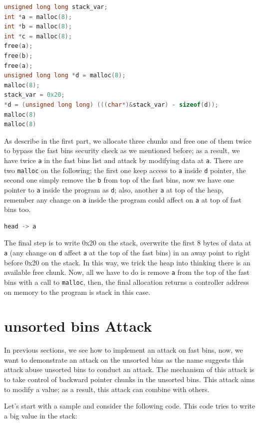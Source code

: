 \documentclass{masterthesis}
\newcommand*\fb{fast bins}
\newcommand*\ub{unsorted bins}
\newcommand*\mallocc{\lstinline{malloc}\xspace}
\begin{document}
\begin{lstlisting}[language=c,frame=tlrb]
unsigned long long stack_var;
int *a = malloc(8);
int *b = malloc(8);
int *c = malloc(8);
free(a);
free(b);
free(a);
unsigned long long *d = malloc(8);
malloc(8);
stack_var = 0x20;
*d = (unsigned long long) (((char*)&stack_var) - sizeof(d));
malloc(8)
malloc(8)
\end{lstlisting}

As describe in the first part, we allocate three chunks and free one of them twice to bypass the \fb{} security check as we mentioned before; as a result, we have twice \lstinline{a} in the \fb{} list and attack by modifying data at \lstinline{a}. There are two \mallocc{} on the following; the first one keep access to \lstinline{a} inside \lstinline{d} pointer, the second one simply remove the \lstinline{b} from top of the \fb{}, now we have one pointer to \lstinline{a} inside the program as \lstinline{d}; also, another \lstinline{a} at top of the heap, remember any change on \lstinline{a} inside the program could affect on \lstinline{a} at top of \fb{} too.

\begin{lstlisting}[language=c,frame=tlrb]
head -> a
\end{lstlisting}

The final step is to write 0x20 on the stack, overwrite the first 8 bytes of data at \lstinline{a} (any change on \lstinline{d} affect \lstinline{a} at the top of the \fb{}) in an away point to right before 0x20 on the stack. In this way, we trick the heap into thinking there is an available free chunk.
 Now, all we have to do is remove \lstinline{a} from the top of the \fb{} with a call to \mallocc{}, then, the final allocation returns a controller address on memory to the program is stack in this case.

\section{\ub{} Attack}

In previous sections, we see how to implement an attack on \fb{}, now, we want to demonstrate an attack on the \ub{} as the name suggests this attack abuse \ub{} to conduct an attack. The mechanism of this attack is to take control of backward pointer chunks in the \ub{}. This attack aims to modify a value; as a result, this attack can combine with others.

Let’s start with a sample and consider the following code. This code tries to write a big value in the stack:
\end{document}
